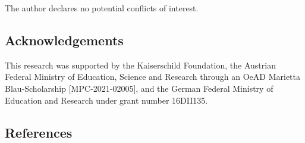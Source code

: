\documentclass[
]{ccr}
\begin{document}
The author declares no potential conflicts of interest.

\hypertarget{acknowledgements}{%
\subsection{Acknowledgements}\label{acknowledgements}}

This research was supported by the Kaiserschild Foundation, the Austrian
Federal Ministry of Education, Science and Research through an OeAD
Marietta Blau‐Scholarship {[}MPC‐2021‐02005{]}, and the German Federal
Ministry of Education and Research under grant number 16DII135.

\hypertarget{references}{%
\subsection{References}\label{references}}
\end{document}
